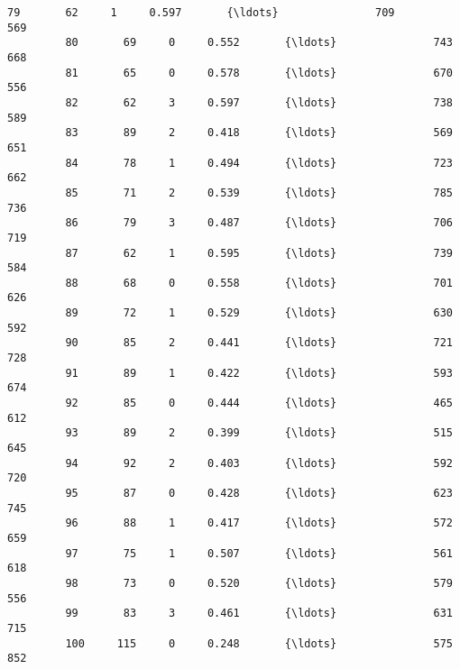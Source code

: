 \documentclass[11pt]{article}
\begin{document}
\begin{Verbatim}[commandchars=\\\{\}]
         79       62     1     0.597       {\ldots}               709             569   
         80       69     0     0.552       {\ldots}               743             668   
         81       65     0     0.578       {\ldots}               670             556   
         82       62     3     0.597       {\ldots}               738             589   
         83       89     2     0.418       {\ldots}               569             651   
         84       78     1     0.494       {\ldots}               723             662   
         85       71     2     0.539       {\ldots}               785             736   
         86       79     3     0.487       {\ldots}               706             719   
         87       62     1     0.595       {\ldots}               739             584   
         88       68     0     0.558       {\ldots}               701             626   
         89       72     1     0.529       {\ldots}               630             592   
         90       85     2     0.441       {\ldots}               721             728   
         91       89     1     0.422       {\ldots}               593             674   
         92       85     0     0.444       {\ldots}               465             612   
         93       89     2     0.399       {\ldots}               515             645   
         94       92     2     0.403       {\ldots}               592             720   
         95       87     0     0.428       {\ldots}               623             745   
         96       88     1     0.417       {\ldots}               572             659   
         97       75     1     0.507       {\ldots}               561             618   
         98       73     0     0.520       {\ldots}               579             556   
         99       83     3     0.461       {\ldots}               631             715   
         100     115     0     0.248       {\ldots}               575             852   
         

\end{Verbatim}
\end{document}
